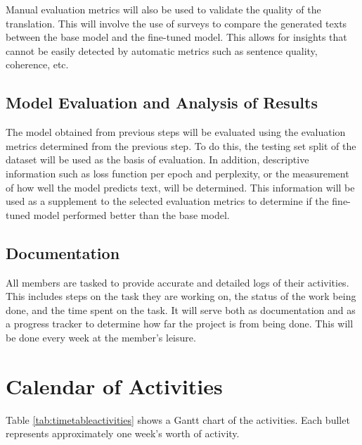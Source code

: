 Manual evaluation metrics will also be used to validate the quality of the translation.
This will involve the use of surveys to compare the generated texts between the base model and the fine-tuned model.
This allows for insights that cannot be easily detected by automatic metrics such as sentence quality, coherence, etc.

\subsection{Model Evaluation and Analysis of Results}
The model obtained from previous steps will be evaluated using the evaluation metrics determined from the previous step.
To do this, the testing set split of the dataset will be used as the basis of evaluation.
In addition, descriptive information such as loss function per epoch and perplexity, or the measurement of how well the model predicts text, will be determined.
This information will be used as a supplement to the selected evaluation metrics to determine if the fine-tuned model performed better than the base model.

\subsection{Documentation}
All members are tasked to provide accurate and detailed logs of their activities.
This includes steps on the task they are working on, the status of the work being done, and the time spent on the task.
It will serve both as documentation and as a progress tracker to determine how far the project is from being done.
This will be done every week at the member’s leisure.


\section{Calendar of Activities}

	Table \ref{tab:timetableactivities} shows a Gantt chart of the activities.  Each bullet represents approximately
	one week's worth of activity.
	
	\newcommand{\weekone}{\textbullet}
	\newcommand{\weektwo}{\textbullet \textbullet}
	\newcommand{\weekthree}{\textbullet \textbullet \textbullet}
	\newcommand{\weekfour}{\textbullet \textbullet \textbullet \textbullet}
	
